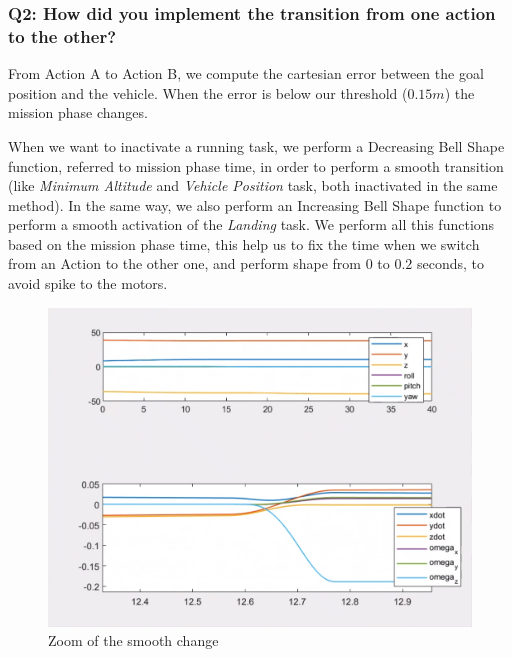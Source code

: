 \documentclass{article}
\begin{document}



\subsubsection{Q2: How did you implement the transition from one action to the other?}

From Action A to Action B, we compute the cartesian error between the goal position and the vehicle. When the error is below our threshold ($0.15m$) the mission phase changes. 

When we want to inactivate a running task, we perform a Decreasing Bell Shape function, referred to mission phase time, in order to perform a smooth transition (like \textit{Minimum Altitude} and \textit{Vehicle Position} task, both inactivated in the same method). In the same way, we also perform an Increasing Bell Shape function to perform a smooth activation of the \textit{Landing} task. We perform all this functions based on the mission phase time, this help us to fix the time when we switch from an Action to the other one, and perform shape from $0$ to $0.2$ seconds, to avoid spike to the motors.
\begin{figure}[!htb]
    \centering
    \includegraphics[scale=0.25]{222_smooth_ppdot.png}
    \caption{Zoom of the smooth change}
    \label{images_2_3_1}
\end{figure}
\end{document}
